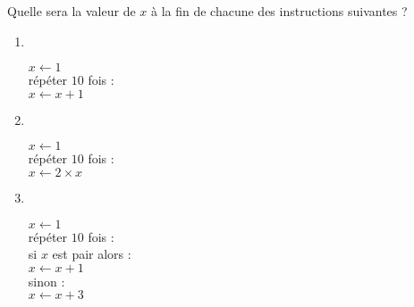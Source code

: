 \documentclass[class=report,crop=false, 12pt]{standalone}
\begin{document}
\begin{activite}
Quelle sera la valeur de $x$ à la fin de chacune des instructions suivantes ? 

\begin{enumerate}
  \item ~ \\
  \begin{minipage}{0.3\textwidth}
$x \leftarrow 1$ \\
répéter $10$ fois : \\
\indentation $x \leftarrow x + 1$
\end{minipage}
  
  \item ~ \\
  \begin{minipage}{0.3\textwidth}
$x \leftarrow 1$ \\
répéter $10$ fois : \\
\indentation $x \leftarrow 2 \times x$
\end{minipage}

  \item ~ \\
  \begin{minipage}{0.3\textwidth}
$x \leftarrow 1$ \\
répéter $10$ fois : \\
\indentation si $x$ est pair alors : \\ 
\indentation\indentation $x \leftarrow x + 1$ \\
\indentation sinon : \\
\indentation\indentation $x \leftarrow x + 3$
\end{minipage}
  
\end{enumerate}



\end{activite}
\end{document}
